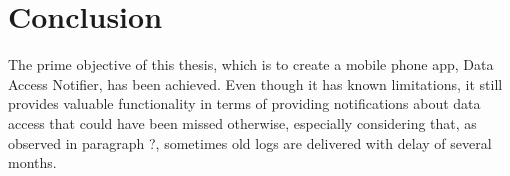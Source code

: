\section{Conclusion} \label{Conclusion}
The prime objective of this thesis, which is to create a mobile phone app, Data Access Notifier, has been achieved. Even though it has known limitations, it still provides valuable functionality in terms of providing notifications about data access that could have been missed otherwise, especially considering that, as observed in paragraph ?, sometimes old logs are delivered with delay of several months.
